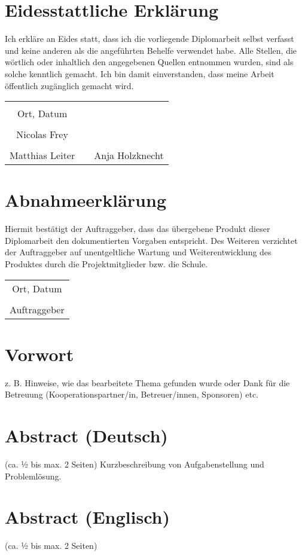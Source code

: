 \chapter*{Eidesstattliche Erklärung}
Ich erkläre an Eides statt, dass ich die vorliegende Diplomarbeit selbst
verfasst und keine anderen als die angeführten Behelfe verwendet habe. Alle Stellen, die wörtlich oder inhaltlich den angegebenen Quellen entnommen wurden, sind als solche kenntlich gemacht.
Ich bin damit einverstanden, dass meine Arbeit öffentlich zugänglich gemacht wird.

\vspace{1cm}
\begin{tabular}{c c c}
	                & \hspace{4cm} &                \\
	\cline{1-1}
	Ort, Datum      &              &                \\
	\vspace{2cm}
	                &              &                \\
	\cline{1-1}
	Nicolas Frey    &              & 				\\
	\vspace{2cm}
	                &              &                \\
	\cline{1-1}					   \cline{3-3}
	Matthias Leiter &              & Anja Holzknecht\\ 
\end{tabular}

\chapter*{Abnahmeerklärung}
Hiermit bestätigt der Auftraggeber, dass das übergebene Produkt dieser Diplomarbeit den dokumentierten Vorgaben entspricht. Des Weiteren verzichtet der Auftraggeber auf unentgeltliche Wartung und Weiterentwicklung des Produktes durch die Projektmitglieder bzw. die Schule.

\vspace{1cm}
\begin{tabular}{c}
	\\\cline{1-1}
	Ort, Datum \\
	\vspace{2cm}
	\\\cline{1-1}
	Auftraggeber
\end{tabular}

\chapter*{Vorwort}
z. B. Hinweise, wie das bearbeitete Thema gefunden wurde oder Dank für die Betreuung (Kooperationspartner/in, Betreuer/innen, Sponsoren) etc.


\chapter*{Abstract (Deutsch)}
 (ca. ½ bis max. 2 Seiten)
Kurzbeschreibung von Aufgabenstellung und Problemlösung.

\chapter*{Abstract (Englisch)}
 (ca. ½ bis max. 2 Seiten)